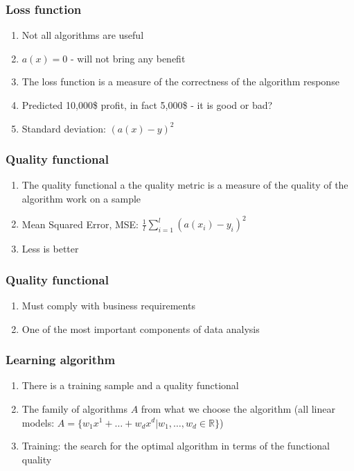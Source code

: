 \documentclass[default]{beamer}
\begin{document}
	\begin{frame}
		\frametitle{Loss function}
		
		\Large
		\begin{enumerate}
			\item Not all algorithms are useful
			\item $a(x)=0$ - will not bring any benefit
			\item The loss function is a measure of the correctness of the algorithm response
			\item Predicted 10,000\$ profit, in fact 5,000\$ -  it is good or bad?
			\item Standard deviation: $(a(x)-y)^2$
		\end{enumerate}
	\end{frame}

	\begin{frame}
		\frametitle{Quality functional}
		
		\Large
		\begin{enumerate}
			\item The quality functional a the quality metric is a measure of the quality of the algorithm work on a sample
			\item Mean Squared Error, MSE: $\frac{1}{l}\sum_{i=1}^l (a(x_i)-y_i)^2$
			\item Less is better
		\end{enumerate}
	\end{frame}

	\begin{frame}
		\frametitle{Quality functional}
		
		\Large
		\begin{enumerate}
			\item Must comply with business requirements
			\item One of the most important components of data analysis
		\end{enumerate}
	\end{frame}

	\begin{frame}
		\frametitle{Learning algorithm}
		
		\Large
		\begin{enumerate}
			\item There is a training sample and a quality functional
			\item The family of algorithms $A$ from what we choose the algorithm (all linear models: $A=\{w_1x^1+\dots+w_dx^d|w_1,\dots,w_d\in \mathbb R\}$)
			\item Training: the search for the optimal algorithm in terms of the functional quality
		\end{enumerate}
	\end{frame}
		
\end{document}
